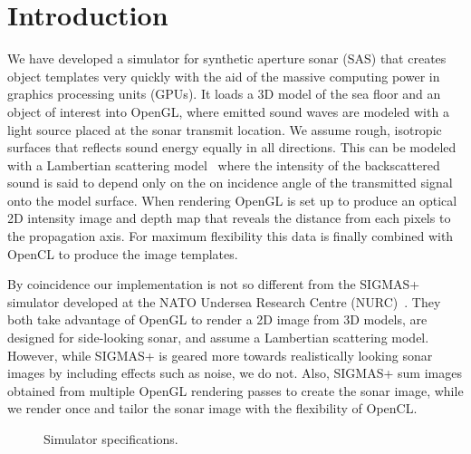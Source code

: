 \documentclass[
   UAM                                          %
 , 12pt                                         %
 , bibtex                                       %
 , layout
]{common/mytemplate}
\begin{document}
\section{Introduction}




We have developed a simulator for synthetic aperture sonar (SAS) that creates object templates very quickly with the aid of the massive computing power in graphics processing units (GPUs). It loads a 3D model of the sea floor and an object of interest into OpenGL, where emitted sound waves are modeled with a light source placed at the sonar transmit location. We assume rough, isotropic surfaces that reflects sound energy equally in all directions. This can be modeled with a Lambertian scattering model~\cite{Bell1997} where the intensity of the backscattered sound is said to depend only on the on incidence angle of the transmitted signal onto the model surface. When rendering OpenGL is set up to produce an optical 2D intensity image and depth map that reveals the distance from each pixels to the propagation axis. For maximum flexibility this data is finally combined with OpenCL to produce the image templates.

By coincidence our implementation is not so different from the SIGMAS+ simulator developed at the NATO Undersea Research Centre (NURC)~\cite{Coiras2009a, Coiras2009b}. They both take advantage of OpenGL to render a 2D image from 3D models, are designed for side-looking sonar, and assume a Lambertian scattering model. However, while SIGMAS+ is geared more towards realistically looking sonar images by including effects such as noise, we do not. Also, SIGMAS+ sum images obtained from multiple OpenGL rendering passes to create the sonar image, while we render once and tailor the sonar image with the flexibility of OpenCL. 


\begin{figure}[t]\centering%
%
\caption{Simulator specifications.}\label{specs}%
\end{figure}
\end{document}
